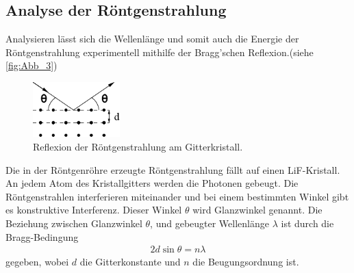 
\subsection{Analyse der Röntgenstrahlung} %
\label{sub:Analyse}

Analysieren lässt sich die Wellenlänge und somit auch die Energie der Röntgenstrahlung experimentell mithilfe der
Bragg'schen Reflexion.(siehe \autoref{fig:Abb_3})
\begin{figure}[H]
    \centering
    \includegraphics[width=0.3\textwidth]{build/Abb_3.pdf}
    \caption{Reflexion der Röntgenstrahlung am Gitterkristall.\cite{V602}}
    \label{fig:Abb_3}
\end{figure}
Die in der Röntgenröhre erzeugte Röntgenstrahlung fällt auf einen LiF-Kristall. An jedem Atom des Kristallgitters werden die
Photonen gebeugt. Die Röntgenstrahlen interferieren miteinander und bei einem bestimmten Winkel gibt es konstruktive Interferenz.
Dieser Winkel $\theta$ wird Glanzwinkel genannt.
Die Beziehung zwischen Glanzwinkel $\theta$, und gebeugter Wellenlänge $\lambda$ ist durch die Bragg-Bedingung
\begin{align}
    2 d \sin{\theta} = n \lambda \label{eqn:Bragg}
\end{align}
gegeben, wobei $d$ die Gitterkonstante und $n$ die Beugungsordnung ist.
